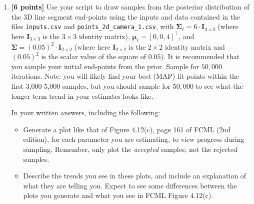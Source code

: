\documentclass[10pt]{article}
\begin{document}
\begin{enumerate}
The written answer for this task requires that you describe how to run your script for the following 4 tasks (tasks 2 through 5). You will complete the writing of these instructions as you complete the following tasks.

{\bf Solution}

The Metropolis-Hastings sampler was implemented to sample from the posterior of $\mathbf{p}_i$ and $\mathbf{p}_f$ given the inputs $t_1, ..., t_s$ which are the ratios that dictate where the points of the line between $q_i$ and $q_f$ are sampled from the formula $q_s = q_i + (q_f - q_i)t_s$. The sampled points which have a Gaussian spread $\mathbf{r}_1,..., \mathbf{r}_s$ and the values for the parameters for the variances and means $\mathbf{\Sigma}$, $\mathbf{\mu}_\ell$ and $\mathbf{\Sigma}_\ell$ are also given. In order to avoid numerical errors that happen when dealing with very small numbers, we use the log of the acceptance ratio in the MH sampler.

\item {\bf [6 points]} \label{task-b} Use your script to draw samples from the posterior distribution of the 3D line segment end-points using the inputs and data contained in the files {\tt inputs.csv} and {\tt points\_2d\_camera\_1.csv}, with $\boldsymbol{\Sigma}_{\boldsymbol{\ell}} = 6 \cdot \mathbf{I}_{3 \times 3}$ (where here $\mathbf{I}_{3 \times 3}$ is the $3 \times 3$ identity matrix), $\boldsymbol{\mu}_{\boldsymbol{\ell}} = [0,0,4]^{\top}$, and $\boldsymbol{\Sigma} = (0.05)^2 \cdot \mathbf{I}_{2 \times 2}$ (where here $\mathbf{I}_{2 \times 2}$ is the $2 \times 2$ identity matrix and $(0.05)^2$ is the scalar value of the square of $0.05$).  It is recommended that you sample your initial end-points from the prior.  Sample for $50,000$ iterations.  Note: you will likely find your best (MAP) fit points within the first 3,000-5,000 samples, but you should sample for $50,000$ to see what the longer-term trend in your estimates looks like.

In your written answers, including the following: 
\begin{itemize}
\item Generate a plot like that of Figure 4.12(c), page 161 of FCML (2nd edition), for each parameter you are estimating, to view progress during sampling.  Remember, only plot the {\em accepted} samples, not the rejected samples.
\item Describe the trends you see in these plots, and include an explanation of what they are telling you.  Expect to see some differences between the plots you generate and what you see in FCML Figure 4.12(c).
\end{itemize}


\end{enumerate}
\end{document}
